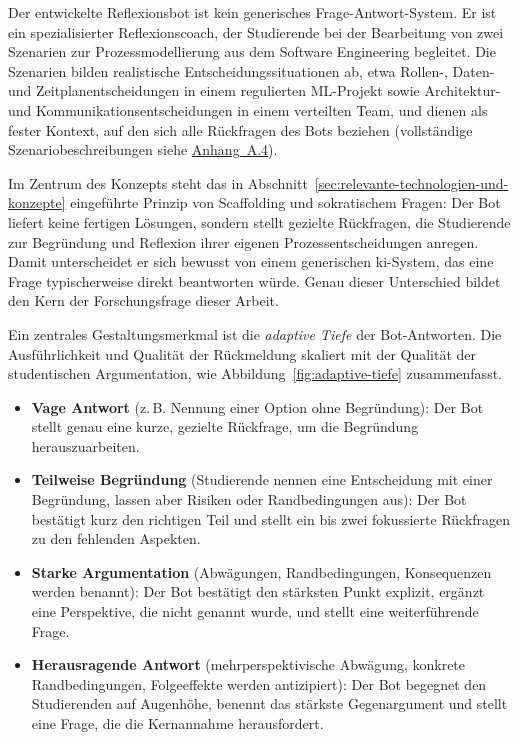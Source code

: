 Der entwickelte Reflexionsbot ist kein generisches Frage-Antwort-System. Er ist ein
spezialisierter Reflexionscoach, der Studierende bei der Bearbeitung von zwei
Szenarien zur Prozessmodellierung aus dem Software Engineering begleitet. Die
Szenarien bilden realistische Entscheidungssituationen ab, etwa Rollen-, Daten- und
Zeitplanentscheidungen in einem regulierten ML-Projekt sowie Architektur- und
Kommunikationsentscheidungen in einem verteilten Team, und dienen als fester
Kontext, auf den sich alle Rückfragen des Bots beziehen (vollständige
Szenariobeschreibungen siehe \hyperref[app:szenarien]{Anhang~A.4}).

Im Zentrum des Konzepts steht das in Abschnitt~\ref{sec:relevante-technologien-und-konzepte}
eingeführte Prinzip von Scaffolding und sokratischem Fragen: Der Bot liefert keine
fertigen Lösungen, sondern stellt gezielte Rückfragen, die Studierende zur Begründung
und Reflexion ihrer eigenen Prozessentscheidungen anregen. Damit unterscheidet er sich
bewusst von einem generischen \acrshort{ki}-System, das eine Frage typischerweise direkt
beantworten würde. Genau dieser Unterschied bildet den Kern der Forschungsfrage dieser
Arbeit.

Ein zentrales Gestaltungsmerkmal ist die \emph{adaptive Tiefe} der Bot-Antworten. Die
Ausführlichkeit und Qualität der Rückmeldung skaliert mit der Qualität der studentischen
Argumentation, wie Abbildung~\ref{fig:adaptive-tiefe} zusammenfasst.

\begin{itemize}
    \item \textbf{Vage Antwort} (z.\,B. Nennung einer Option ohne Begründung): Der Bot
        stellt genau eine kurze, gezielte Rückfrage, um die Begründung herauszuarbeiten.
    \item \textbf{Teilweise Begründung} (Studierende nennen eine Entscheidung mit einer
        Begründung, lassen aber Risiken oder Randbedingungen aus): Der Bot bestätigt kurz
        den richtigen Teil und stellt ein bis zwei fokussierte Rückfragen zu den fehlenden
        Aspekten.
    \item \textbf{Starke Argumentation} (Abwägungen, Randbedingungen, Konsequenzen werden
        benannt): Der Bot bestätigt den stärksten Punkt explizit, ergänzt eine Perspektive,
        die nicht genannt wurde, und stellt eine weiterführende Frage.
    \item \textbf{Herausragende Antwort} (mehrperspektivische Abwägung, konkrete
        Randbedingungen, Folgeeffekte werden antizipiert): Der Bot begegnet den
        Studierenden auf Augenhöhe, benennt das stärkste Gegenargument und stellt eine
        Frage, die die Kernannahme herausfordert.
\end{itemize}

